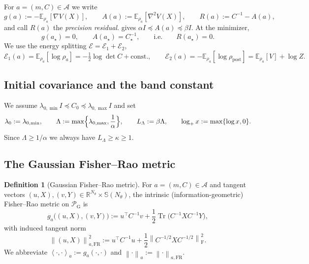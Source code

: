 \documentclass[11pt]{article}
\theoremstyle{plain}
\theoremstyle{definition}
\newtheorem{definition}[definition]{Definition}
\theoremstyle{remark}
\newcommand{\R}{\mathbb{R}}
\newcommand{\E}{\mathbb{E}}
\newcommand{\Tr}{\operatorname{Tr}}
\newcommand{\Sym}{\mathbb{S}}
\newcommand{\Id}{I}
\newcommand{\Frob}{\mathrm{F}}
\newcommand{\post}{\mathrm{post}}
\newcommand{\FR}{\mathrm{FR}}
\newcommand{\calE}{\mathcal{E}}
\newcommand{\PG}{\mathcal{P}_{\mathrm G}}
\newcommand{\Aspace}{\mathcal{A}}
\newcommand{\norm}[1]{\left\lVert #1\right\rVert}
\newcommand{\inner}[2]{\left\langle #1,#2\right\rangle}
\newcommand{\logp}{\log_+}
\newcommand{\LB}{L_\Lambda}
\begin{document}
For $a=(m,C)\in\Aspace$ we write
\begin{equation}
\label{eq:gAR}
    g(a):=-\E_{\rho_a}[\nabla V(X)],
    \qquad
    A(a):=\E_{\rho_a}[\nabla^2V(X)],
    \qquad
    R(a):=C^{-1}-A(a),
\end{equation}
and call $R(a)$ the \emph{precision residual}.  gives
$\alpha\Id\preceq A(a)\preceq\beta\Id$. At the minimizer,
\begin{equation}
\label{eq:first-order}
    g(a_\star)=0,
    \qquad
    A(a_\star)=C_\star^{-1},
    \qquad\text{i.e.}\qquad
    R(a_\star)=0 .
\end{equation}
We use the energy splitting $\calE=\calE_1+\calE_2$,
\begin{equation}
\label{eq:splitting}
    \calE_1(a)=\E_{\rho_a}[\log\rho_a]=-\tfrac12\log\det C+\text{const.},
    \qquad
    \calE_2(a)=-\E_{\rho_a}[\log\rho_{\post}]=\E_{\rho_a}[V]+\log Z .
\end{equation}

\subsection{Initial covariance and the band constant}

We assume $\lambda_{0,\min}\Id\preceq C_0\preceq\lambda_{0,\max}\Id$ and set
\begin{equation}
\label{eq:Lambda}
    \lambda_0:=\lambda_{0,\min},
    \qquad
    \Lambda:=\max\Bigl\{\lambda_{0,\max},\frac1\alpha\Bigr\},
    \qquad
    \LB:=\beta\Lambda,
    \qquad
    \logp x:=\max\{\log x,0\}.
\end{equation}
Since $\Lambda\geq1/\alpha$ we always have $\LB\geq\kappa\geq1$.

\subsection{The Gaussian Fisher--Rao metric}
\label{sec:metric}

\begin{definition}[Gaussian Fisher--Rao metric]
\label{def:FR-metric}
For $a=(m,C)\in\Aspace$ and tangent vectors
$(u,X),(v,Y)\in\R^{N_\theta}\times\Sym(N_\theta)$, the intrinsic (information-geometric)
Fisher--Rao metric on $\PG$ is
\begin{equation}
\label{eq:FR-metric}
    g_a\bigl((u,X),(v,Y)\bigr)
    :=
    u^\top C^{-1}v+\frac12\Tr\bigl(C^{-1}XC^{-1}Y\bigr),
\end{equation}
with induced tangent norm
\begin{equation}
\label{eq:tangent-norm}
    \norm{(u,X)}_{a,\FR}^2
    :=
    u^\top C^{-1}u+\frac12\norm{C^{-1/2}XC^{-1/2}}_{\Frob}^2 .
\end{equation}
We abbreviate $\inner{\cdot}{\cdot}_a:=g_a(\cdot,\cdot)$ and $\norm{\cdot}_a:=\norm{\cdot}_{a,\FR}$.
\end{definition}
\end{document}
